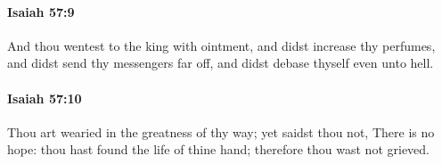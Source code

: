 		\paragraph{Isaiah 57:9} %
			\label{ISAIAH-57-9}

			And thou wentest to the king with ointment, and didst increase thy perfumes, and didst send thy messengers far off, and didst debase thyself even unto hell.


		\paragraph{Isaiah 57:10} %
			\label{ISAIAH-57-10}

			Thou art wearied in the greatness of thy way; yet saidst thou not, There is no hope: thou hast found the life of thine hand; therefore thou wast not grieved.



